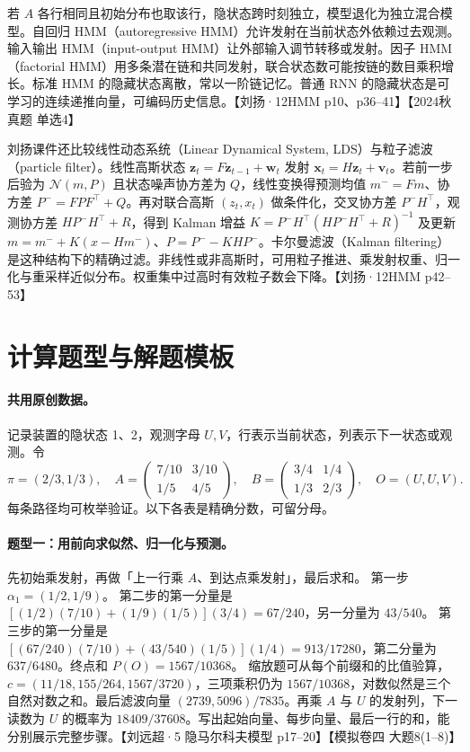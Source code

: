\documentclass[UTF8,a4paper,zihao=-4,fontset=fandol]{ctexrep}
\begin{document}
若 $A$ 各行相同且初始分布也取该行，隐状态跨时刻独立，模型退化为独立混合模型。自回归 HMM（autoregressive HMM）允许发射在当前状态外依赖过去观测。输入输出 HMM（input-output HMM）让外部输入调节转移或发射。因子 HMM（factorial HMM）用多条潜在链和共同发射，联合状态数可能按链的数目乘积增长。标准 HMM 的隐藏状态离散，常以一阶链记忆。普通 RNN 的隐藏状态是可学习的连续递推向量，可编码历史信息。【刘扬·12HMM p10、p36–41】【2024秋真题 单选4】

刘扬课件还比较线性动态系统（Linear Dynamical System, LDS）与粒子滤波（particle filter）。线性高斯状态 $\bm z_t=F\bm z_{t-1}+\bm w_t$ 发射 $\bm x_t=H\bm z_t+\bm v_t$。若前一步后验为 $\mathcal N(m,P)$ 且状态噪声协方差为 $Q$，线性变换得预测均值 $m^-=Fm$、协方差 $P^-=FPF^\top+Q$。再对联合高斯 $(z_t,x_t)$ 做条件化，交叉协方差 $P^-H^\top$，观测协方差 $HP^-H^\top+R$，得到 Kalman 增益 $K=P^-H^\top(HP^-H^\top+R)^{-1}$ 及更新 $m=m^-+K(x-Hm^-)$、$P=P^--KHP^-$。卡尔曼滤波（Kalman filtering）是这种结构下的精确过滤。非线性或非高斯时，可用粒子推进、乘发射权重、归一化与重采样近似分布。权重集中过高时有效粒子数会下降。【刘扬·12HMM p42–53】

\section{计算题型与解题模板}

\paragraph{共用原创数据。}
记录装置的隐状态 1、2，观测字母 $U,V$，行表示当前状态，列表示下一状态或观测。令
\[
\pi=(2/3,1/3),\quad A=\begin{pmatrix}7/10&3/10\\1/5&4/5\end{pmatrix},\quad
B=\begin{pmatrix}3/4&1/4\\1/3&2/3\end{pmatrix},\quad O=(U,U,V).
\]
每条路径均可枚举验证。以下各表是精确分数，可留分母。

\paragraph{题型一：用前向求似然、归一化与预测。}
先初始乘发射，再做「上一行乘 $A$、到达点乘发射」，最后求和。
第一步 $\alpha_1=(1/2,1/9)$。
第二步的第一分量是 $[(1/2)(7/10)+(1/9)(1/5)](3/4)=67/240$，另一分量为 $43/540$。
第三步的第一分量是 $[(67/240)(7/10)+(43/540)(1/5)](1/4)=913/17280$，第二分量为 $637/6480$。终点和 $P(O)=1567/10368$。
缩放题可从每个前缀和的比值验算，$c=(11/18,155/264,1567/3720)$，三项乘积仍为 $1567/10368$，对数似然是三个自然对数之和。最后滤波向量 $(2739,5096)/7835$。再乘 $A$ 与 $U$ 的发射列，下一读数为 $U$ 的概率为 $18409/37608$。写出起始向量、每步向量、最后一行的和，能分别展示完整步骤。【刘远超·5 隐马尔科夫模型 p17–20】【模拟卷四 大题8(1–8)】
\end{document}
